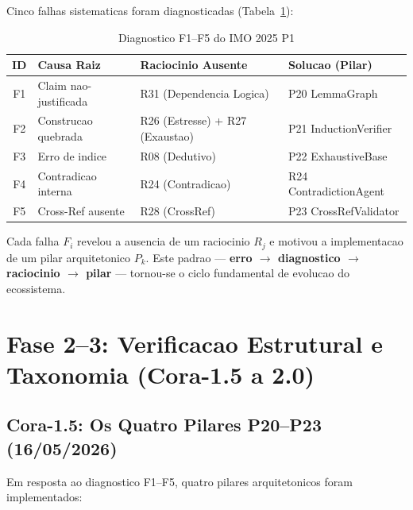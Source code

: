 \documentclass[5p]{elsarticle}
\newcommand{\tabfootnotesize}{\fontsize{9}{11}\selectfont}
\begin{document}
Cinco falhas sistematicas foram diagnosticadas (Tabela~\ref{tab:f1f5}):

\begin{table}[H]
\centering
\caption{Diagnostico F1--F5 do IMO 2025 P1}
\label{tab:f1f5}
\tabfootnotesize
\begin{tabular}{c p{3cm} p{4cm} p{3cm}}
\toprule
\textbf{ID} & \textbf{Causa Raiz} & \textbf{Raciocinio Ausente} & \textbf{Solucao (Pilar)}\\
\midrule
F1 & Claim nao-justificada & R31 (Dependencia Logica) & P20 LemmaGraph\\
F2 & Construcao quebrada & R26 (Estresse) + R27 (Exaustao) & P21 InductionVerifier\\
F3 & Erro de indice & R08 (Dedutivo) & P22 ExhaustiveBase\\
F4 & Contradicao interna & R24 (Contradicao) & R24 ContradictionAgent\\
F5 & Cross-Ref ausente & R28 (CrossRef) & P23 CrossRefValidator\\
\bottomrule
\end{tabular}
\end{table}

Cada falha $F_i$ revelou a ausencia de um raciocinio $R_j$ e motivou a
implementacao de um pilar arquitetonico $P_k$. Este padrao --- \textbf{erro $\to$
diagnostico $\to$ raciocinio $\to$ pilar} --- tornou-se o ciclo fundamental de
evolucao do ecossistema.

\section{Fase 2--3: Verificacao Estrutural e Taxonomia (Cora-1.5 a 2.0)}

\subsection{Cora-1.5: Os Quatro Pilares P20--P23 (16/05/2026)}

Em resposta ao diagnostico F1--F5, quatro pilares arquitetonicos foram
implementados:
\end{document}
